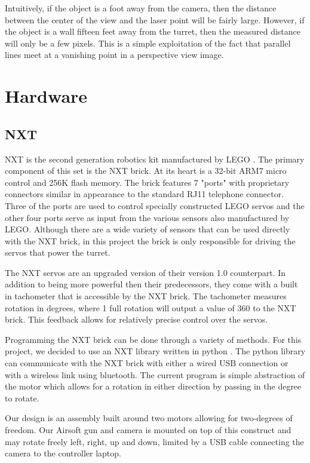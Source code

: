 \documentclass[10pt,twocolumn,letterpaper]{article}
\begin{document}
Intuitively, if the object is a foot away from the camera, then the distance between the center of the view and the laser point will be fairly large.  However, if the object is a wall fifteen feet away from the turret, then the measured distance will only be a few pixels.  This is a simple exploitation of the fact that parallel lines meet at a vanishing point in a perspective view image. 

\section{Hardware}

\subsection{NXT}

NXT is the second generation robotics kit manufactured by LEGO \cite{nxt}. The primary component of this set is the NXT brick. At its heart is a 32-bit ARM7 micro control and 256K flash memory. The brick features 7 "ports" with proprietary connectors similar in appearance to the standard RJ11 telephone connector. Three of the ports are used to control specially constructed LEGO servos and the other four ports serve as input from the various sensors also manufactured by LEGO. Although there are a wide variety of sensors that can be used directly with the NXT brick, in this project the brick is only responsible for driving the servos that power the turret.

The NXT servos are an upgraded version of their version 1.0 counterpart. In addition to being more powerful then their predecessors, they come with a built in tachometer that is accessible by the NXT brick. The tachometer measures rotation in degrees, where 1 full rotation will output a value of 360 to the NXT brick. This feedback allows for relatively precise control over the servos.

Programming the NXT brick can be done through a variety of methods. For this project, we decided to use an NXT library written in python \cite{pynxt}. The python library can communicate with the NXT brick with either a wired USB connection or with a wireless link using bluetooth. The current program is simple abstraction of the motor which allows for a rotation in either direction by passing in the degree to rotate.

Our design is an assembly built around two motors allowing for two-degrees of freedom. Our Airsoft gun and camera is mounted on top of this construct and may rotate freely left, right, up and down, limited by a USB cable connecting the camera to the controller laptop.
 
\end{document}
